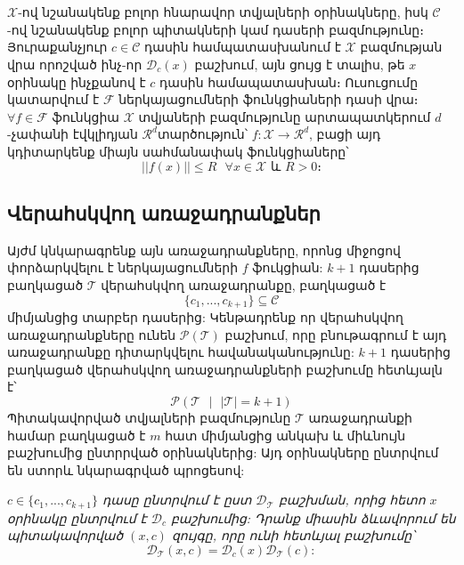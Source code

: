 \documentclass[11pt]{article}
\begin{document}
\section*{\hfill 
 \hfill} \noindent
{}
{}
 
 $\mathcal{X}$-ով նշանակենք բոլոր հնարավոր տվյալների օրինակները, իսկ $\mathcal{C}$-ով նշանակենք բոլոր պիտակների կամ դասերի բազմությունը։ Յուրաքանչյուր $c \in \mathcal{C}$ դասին համպատասխանում է $\mathcal{X}$ բազմության վրա որոշված ինչ-որ $\mathcal{D}_c(x)$ բաշխում, այն ցույց է տալիս, թե $x$ օրինակը ինչքանով է $c$ դասին համապատասխան։ Ուսուցումը կատարվում է $\mathcal{F}$ ներկայացումների ֆունկցիաների դասի վրա։ $\forall f \in \mathcal{F}$  ֆունկցիա $\mathcal{X}$ տվյաների բազմությունը արտապատկերում $d$-չափանի էվկլիդյան $\mathcal{R}^d$տարծություն՝ $f:\mathcal{X}\rightarrow\mathcal{R}^d$, բացի այդ կդիտարկենք միայն սահմանափակ ֆունկցիաները՝
 $$||f(x)|| \leq R \text{    } \forall x \in \mathcal{X} \text{ և } R > 0։$$ 



\subsection*{Վերահսկվող առաջադրանքներ}

\par Այժմ կնկարագրենք այն առաջադրանքները, որոնց միջոցով փորձարկվելու է ներկայացումների $f$ ֆուկցիան: $k+1$ դասերից բաղկացած $\mathcal{T}$ վերահսկվող առաջադրանքը, բաղկացած է $$\{c_1, ..., c_{k+1}\} \subseteq \mathcal{C}$$
միմյանցից տարբեր դասերից: Կենթադրենք որ վերահսկվող առաջադրանքները ունեն $\mathcal{P}(\mathcal{T})$ բաշխում, որը բնութագրում է այդ առաջադրանքը դիտարկվելու հավանականությունը: $k+1$ դասերից բաղկացած վերահսկվող առաջադրանքների բաշխումը հետևյալն է՝ $$\mathcal{P}(\mathcal{T} \text{ } |\text{ }  |\mathcal{T}| = k +1)$$ Պիտակավորված տվյալների բազմությունը $\mathcal{T}$ առաջադրանքի համար բաղկացած է $m$ հատ միմյանցից անկախ և միևնույն բաշխումից ընտրրված օրինակներից: Այդ օրինակները ընտրվում են ստորև նկարագրված պրոցեսով:

\textit{$c \in \{c_1, ..., c_{k+1}\} $   դասը ընտրվում է ըստ $\mathcal{D}_{\mathcal{T}}$ բաշխման, որից հետո $x$ օրինակը ընտրվում է $\mathcal{D}_c$ բաշխումից: Դրանք միասին ձևավորում են պիտակավորված $(x, c)$ զույգը, որը ունի հետևյալ բաշխումը՝
$$\mathcal{D}_{\mathcal{T}} (x, c) = \mathcal{D}_{c}(x)\mathcal{D}_{\mathcal{T}}(c):$$}
\end{document}

